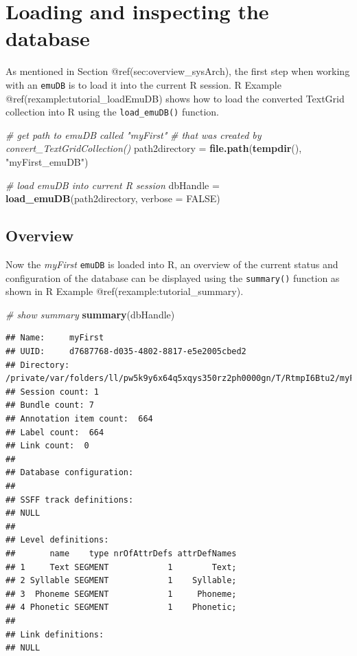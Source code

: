 \documentclass[]{book}
\newenvironment{Shaded}{\begin{snugshade}}{\end{snugshade}}
\newcommand{\KeywordTok}[1]{\textcolor[rgb]{0.13,0.29,0.53}{\textbf{{#1}}}}
\newcommand{\DataTypeTok}[1]{\textcolor[rgb]{0.13,0.29,0.53}{{#1}}}
\newcommand{\StringTok}[1]{\textcolor[rgb]{0.31,0.60,0.02}{{#1}}}
\newcommand{\CommentTok}[1]{\textcolor[rgb]{0.56,0.35,0.01}{\textit{{#1}}}}
\newcommand{\OtherTok}[1]{\textcolor[rgb]{0.56,0.35,0.01}{{#1}}}
\newcommand{\NormalTok}[1]{{#1}}
\theoremstyle{definition}
\theoremstyle{definition}
\theoremstyle{definition}
\theoremstyle{remark}
\begin{document}
\section{Loading and inspecting the
database}\label{loading-and-inspecting-the-database}

As mentioned in Section @ref(sec:overview\_sysArch), the first step when
working with an \texttt{emuDB} is to load it into the current R session.
R Example @ref(rexample:tutorial\_loadEmuDB) shows how to load the
converted TextGrid collection into R using the \texttt{load\_emuDB()}
function.

\begin{Shaded}
\begin{Highlighting}[]
\CommentTok{# get path to emuDB called "myFirst"}
\CommentTok{# that was created by convert_TextGridCollection()}
\NormalTok{path2directory =}\StringTok{ }\KeywordTok{file.path}\NormalTok{(}\KeywordTok{tempdir}\NormalTok{(), }\StringTok{"myFirst_emuDB"}\NormalTok{)}

\CommentTok{# load emuDB into current R session}
\NormalTok{dbHandle =}\StringTok{ }\KeywordTok{load_emuDB}\NormalTok{(path2directory, }\DataTypeTok{verbose =} \OtherTok{FALSE}\NormalTok{)}
\end{Highlighting}
\end{Shaded}

\subsection{Overview}\label{overview}

Now the \emph{myFirst} \texttt{emuDB} is loaded into R, an overview of
the current status and configuration of the database can be displayed
using the \texttt{summary()} function as shown in R Example
@ref(rexample:tutorial\_summary).

\begin{Shaded}
\begin{Highlighting}[]
\CommentTok{# show summary}
\KeywordTok{summary}\NormalTok{(dbHandle)}
\end{Highlighting}
\end{Shaded}

\begin{verbatim}
## Name:     myFirst 
## UUID:     d7687768-d035-4802-8817-e5e2005cbed2 
## Directory:    /private/var/folders/ll/pw5k9y6x64q5xqys350rz2ph0000gn/T/RtmpI6Btu2/myFirst_emuDB 
## Session count: 1 
## Bundle count: 7 
## Annotation item count:  664 
## Label count:  664 
## Link count:  0 
## 
## Database configuration:
## 
## SSFF track definitions:
## NULL
## 
## Level definitions:
##       name    type nrOfAttrDefs attrDefNames
## 1     Text SEGMENT            1        Text;
## 2 Syllable SEGMENT            1    Syllable;
## 3  Phoneme SEGMENT            1     Phoneme;
## 4 Phonetic SEGMENT            1    Phonetic;
## 
## Link definitions:
## NULL
\end{verbatim}
\end{document}
